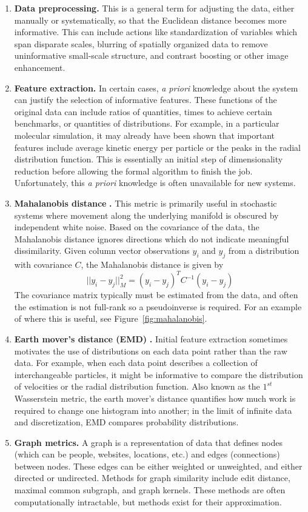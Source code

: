 \documentclass[12pt]{article}
\begin{document}
\begin{enumerate}
\item \textbf{Data preprocessing.}  This is a general term for adjusting the data, either manually or systematically, so that the Euclidean distance becomes more informative. This can include actions like standardization of variables which span disparate scales, blurring of spatially organized data to remove uninformative small-scale structure, and contrast boosting or other image enhancement.
\item \textbf{Feature extraction.} In certain cases, \textit{a priori} knowledge about the system can justify the selection of informative features. These functions of the original data can include ratios of quantities, times to achieve certain benchmarks, or quantities of distributions. For example, in a particular molecular simulation, it may already have been shown that important features include average kinetic energy per particle or the peaks in the radial distribution function. This is essentially an initial step of dimensionality reduction before allowing the formal algorithm to finish the job. Unfortunately, this \textit{a priori} knowledge is often unavailable for new systems.
\item \textbf{Mahalanobis distance }\cite{Dsilva2015, Dsilva, Mahalanobis1936}\textbf{.}  This metric is primarily useful in stochastic systems where movement along the underlying manifold is obscured by independent white noise. Based on the covariance of the data, the Mahalanobis distance ignores directions which do not indicate meaningful dissimilarity. Given column vector observations $y_i$ and $y_j$ from a distribution with covariance $C$, the Mahalanobis distance is given by
\[
||y_i-y_j||^2_M = (y_i-y_j)^TC^{-1}(y_i-y_j)
\]
The covariance matrix typically must be estimated from the data, and often the estimation is not full-rank so a pseudoinverse is required. For an example of where this is useful, see Figure~\ref{fig:mahalanobis}.
\item \textbf{Earth mover's distance (EMD) }\cite{Levina2001}\textbf{.}   Initial feature extraction sometimes motivates the use of distributions on each data point rather than the raw data. For example, when each data point describes a collection of interchangeable particles, it might be informative to compare the distribution of velocities or the radial distribution function. Also known as the $1^{st}$ Wasserstein metric, the earth mover's distance quantifies how much work is required to change one histogram into another; in the limit of infinite data and discretization, EMD compares probability distributions.
\item \textbf{Graph metrics.} A graph is a representation of data that defines nodes (which can be people, websites, locations, etc.) and edges (connections) between nodes. These edges can be either weighted or unweighted, and either directed or undirected. Methods for graph similarity include edit distance, maximal common subgraph, and graph kernels. These methods are often computationally intractable, but methods exist for their approximation.
\end{enumerate}
\end{document}
